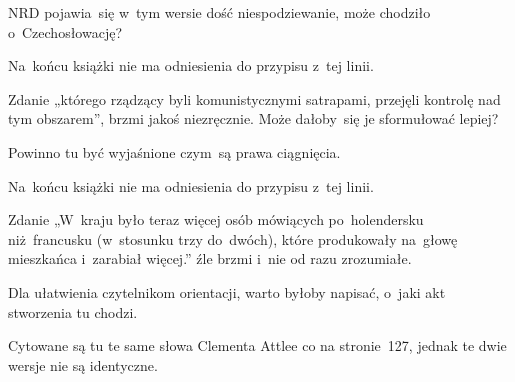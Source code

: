 \documentclass[a4paper,11pt]{article}
\begin{document}
\vspace{\spaceFour}


\start {} NRD pojawia~się w~tym wersie dość
niespodziewanie, może chodziło o~Czechosłowację?

\vspace{\spaceFour}


\start {} Na~końcu książki nie ma odniesienia do przypisu
z~tej linii.

\vspace{\spaceFour}


\start {} Zdanie „którego rządzący byli
komunistycznymi satrapami, przejęli kontrolę nad tym obszarem”, brzmi
jakoś niezręcznie. Może dałoby~się je sformułować lepiej?

\vspace{\spaceFour}


\start {} Powinno tu być wyjaśnione czym~są prawa
ciągnięcia.

\vspace{\spaceFour}


\start {} Na~końcu książki nie ma odniesienia do przypisu
z~tej linii.

\vspace{\spaceFour}


\start {} Zdanie „W~kraju było teraz więcej osób
mówiących po~holendersku niż~francusku (w~stosunku trzy do~dwóch),
które produkowały na~głowę mieszkańca i~zarabiał więcej.” źle brzmi
i~nie od razu zrozumiałe.

\vspace{\spaceFour}


\start {} Dla ułatwienia czytelnikom
orientacji, warto byłoby napisać, o~jaki akt stworzenia tu chodzi.

\vspace{\spaceFour}


\start {} Cytowane są tu te same słowa
Clementa Attlee co na stronie~127, jednak te dwie wersje nie są
identyczne.



\nopagebreak
\end{document}
